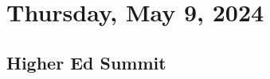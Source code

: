 \section{Thursday, May 9, 2024}\label{sec:day3}

\subsection[09:00-16:00 Higher Ed Summit]{Higher Ed Summit}\label{subsec:summit}
